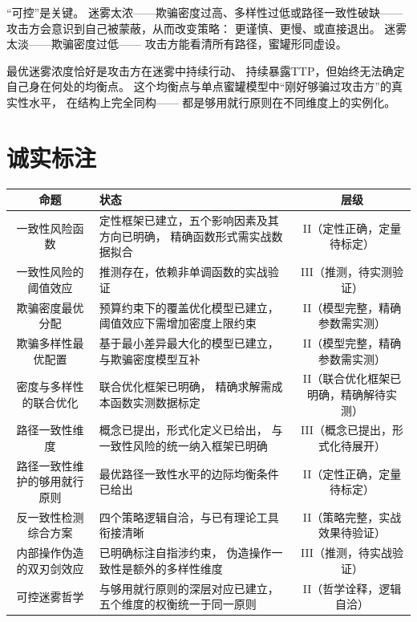 \documentclass[11pt,a4paper]{article}
\begin{document}
“可控”是关键。
迷雾太浓——欺骗密度过高、多样性过低或路径一致性破缺——
攻击方会意识到自己被蒙蔽，从而改变策略：
更谨慎、更慢、或直接退出。
迷雾太淡——欺骗密度过低——
攻击方能看清所有路径，蜜罐形同虚设。

最优迷雾浓度恰好是攻击方在迷雾中持续行动、
持续暴露TTP，但始终无法确定自己身在何处的均衡点。
这个均衡点与单点蜜罐模型中“刚好够骗过攻击方”的真实性水平，
在结构上完全同构——
都是够用就行原则在不同维度上的实例化。

\section{诚实标注}

\begin{center}
\begin{xltabular}{\textwidth}{c|X|c}
\toprule
\textbf{命题} & \textbf{状态} & \textbf{层级} \\
\midrule
一致性风险函数 &
定性框架已建立，五个影响因素及其方向已明确，
精确函数形式需实战数据拟合 &
II（定性正确，定量待标定） \\
一致性风险的阈值效应 &
推测存在，依赖非单调函数的实战验证 &
III（推测，待实测验证） \\
欺骗密度最优分配 &
预算约束下的覆盖优化模型已建立，
阈值效应下需增加密度上限约束 &
II（模型完整，精确参数需实测） \\
欺骗多样性最优配置 &
基于最小差异最大化的模型已建立，
与欺骗密度模型互补 &
II（模型完整，精确参数需实测） \\
密度与多样性的联合优化 &
联合优化框架已明确，
精确求解需成本函数实测数据标定 &
II（联合优化框架已明确，精确解待实测） \\
路径一致性维度 &
概念已提出，形式化定义已给出，
与一致性风险的统一纳入框架已明确 &
III（概念已提出，形式化待展开） \\
路径一致性维护的够用就行原则 &
最优路径一致性水平的边际均衡条件已给出 &
II（定性正确，定量待标定） \\
反一致性检测综合方案 &
四个策略逻辑自洽，与已有理论工具衔接清晰 &
II（策略完整，实战效果待验证） \\
内部操作伪造的双刃剑效应 &
已明确标注自指涉约束，
伪造操作一致性是额外的多样性维度 &
III（推测，待实战验证） \\
可控迷雾哲学 &
与够用就行原则的深层对应已建立，
五个维度的权衡统一于同一原则 &
II（哲学诠释，逻辑自洽） \\
\bottomrule
\end{xltabular}
\end{center}
\end{document}
